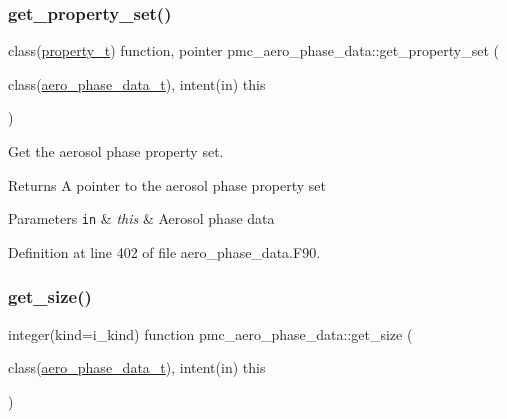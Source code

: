 \subsubsection{\texorpdfstring{get\+\_\+property\+\_\+set()}{get\_property\_set()}}
{\footnotesize\ttfamily class(\mbox{\hyperlink{structpmc__property_1_1property__t}{property\+\_\+t}}) function, pointer pmc\+\_\+aero\+\_\+phase\+\_\+data\+::get\+\_\+property\+\_\+set (\begin{DoxyParamCaption}\item[{class(\mbox{\hyperlink{structpmc__aero__phase__data_1_1aero__phase__data__t}{aero\+\_\+phase\+\_\+data\+\_\+t}}), intent(in)}]{this }\end{DoxyParamCaption})\hspace{0.3cm}{\ttfamily [private]}}



Get the aerosol phase property set. 

\begin{DoxyReturn}{Returns}
A pointer to the aerosol phase property set
\end{DoxyReturn}

\begin{DoxyParams}[1]{Parameters}
\mbox{\tt in}  & {\em this} & Aerosol phase data \\
\hline
\end{DoxyParams}


Definition at line 402 of file aero\+\_\+phase\+\_\+data.\+F90.

\mbox{\label{namespacepmc__aero__phase__data_acf59c1ac8fbb92b9d922cc94d4a89571}} 
\subsubsection{\texorpdfstring{get\+\_\+size()}{get\_size()}}
{\footnotesize\ttfamily integer(kind=i\+\_\+kind) function pmc\+\_\+aero\+\_\+phase\+\_\+data\+::get\+\_\+size (\begin{DoxyParamCaption}\item[{class(\mbox{\hyperlink{structpmc__aero__phase__data_1_1aero__phase__data__t}{aero\+\_\+phase\+\_\+data\+\_\+t}}), intent(in)}]{this }\end{DoxyParamCaption})\hspace{0.3cm}{\ttfamily [private]}}



